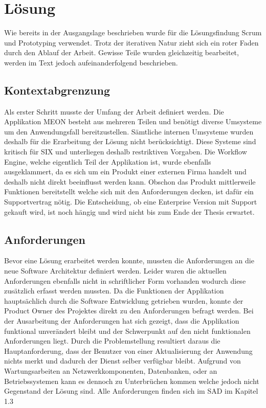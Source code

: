 \graphicspath{{./images/}}

\chapter{Lösung}

Wie bereits in der Ausgangslage beschrieben wurde für die Lösungsfindung Scrum und Prototyping verwendet. Trotz der iterativen Natur zieht sich ein roter Faden durch den Ablauf der Arbeit. Gewisse Teile wurden gleichzeitig bearbeitet, werden im Text jedoch aufeinanderfolgend beschrieben.

\section{Kontextabgrenzung}

Als erster Schritt musste der Umfang der Arbeit definiert werden. Die Applikation MEON besteht aus mehreren Teilen und benötigt diverse Umsysteme um den Anwendungsfall bereitzustellen. Sämtliche internen Umsysteme wurden deshalb für die Erarbeitung der Lösung nicht berücksichtigt. Diese Systeme sind kritisch für SIX und unterliegen deshalb restriktiven Vorgaben. Die Workflow Engine, welche eigentlich Teil der Applikation ist, wurde ebenfalls ausgeklammert, da es sich um ein Produkt einer externen Firma handelt und deshalb nicht direkt beeinflusst werden kann. Obschon das Produkt mittlerweile Funktionen bereitstellt welche sich mit den Anforderungen decken, ist dafür ein Supportvertrag nötig. Die Entscheidung, ob eine Enterprise Version mit Support gekauft wird, ist noch hängig und wird nicht bis zum Ende der Thesis erwartet.

\section{Anforderungen}

Bevor eine Lösung erarbeitet werden konnte, mussten die Anforderungen an die neue Software Architektur definiert werden. Leider waren die aktuellen Anforderungen ebenfalls nicht in schriftlicher Form vorhanden wodurch diese zusätzlich erfasst werden mussten. Da die Funktionen der Applikation hauptsächlich durch die Software Entwicklung getrieben wurden, konnte der Product Owner des Projektes direkt zu den Anforderungen befragt werden. Bei der Ausarbeitung der Anforderungen hat sich gezeigt, dass die Applikation funktional unverändert bleibt und der Schwerpunkt auf den nicht funktionalen Anforderungen liegt. Durch die Problemstellung resultiert daraus die Hauptanforderung, dass der Benutzer von einer Aktualisierung der Anwendung nichts merkt und dadurch der Dienst selber verfügbar bleibt. Aufgrund von Wartungsarbeiten an Netzwerkkomponenten, Datenbanken, oder an Betriebssystemen kann es dennoch zu Unterbrüchen kommen welche jedoch nicht Gegenstand der Lösung sind. Alle Anforderungen finden sich im SAD im Kapitel 1.3

